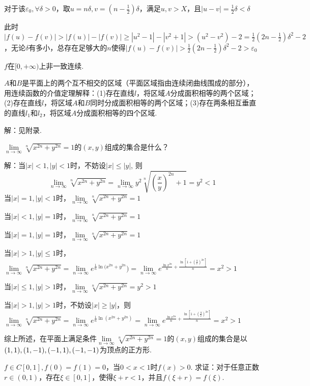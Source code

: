 \documentclass[12pt,UTF8]{ctexart}
\begin{document}
\begin{enumerate}
对于该$\varepsilon_0,\forall\delta>0$，取$u=n\delta,v=(n-\frac12)\delta$，满足$u,v>X$，且$|u-v|=\frac12\delta<\delta$

此时$|f(u)-f(v)|>|f(u)|-|f(v)|\geq|u^2-1|-|v^2+1|>(u^2-v^2)-2=\frac12(2n-\frac12)\delta^2-2$，无论$\delta$有多小，总存在足够大的$n$使得$|f(u)-f(v)|>\frac12(2n-\frac12)\delta^2-2>\varepsilon_0$

$f$在$[0,+\infty)$上非一致连续.

$A$和$B$是平面上的两个互不相交的区域（平面区域指由连续闭曲线围成的部分），用连续函数的介值定理解释：(1)存在直线$l$，将区域$A$分成面积相等的两个区域；(2)存在直线$l$，将区域$A$和$B$同时分成面积相等的两个区域；(3)存在两条相互垂直的直线$l_1$和$l_2$，将区域$A$分成面积相等的四个区域.

解：见附录.

$\lim\limits_{n\rightarrow\infty}\sqrt[n]{x^{2n}+y^{2n}}=1$的$(x,y)$组成的集合是什么？

解：当$|x|<1,|y|<1$时，不妨设$|x|\leq|y|$, 则
\[\lim\limits_{n\rightarrow\infty}\sqrt[n]{x^{2n}+y^{2n}}=\lim\limits_{n\rightarrow\infty}y^2\sqrt[n]{(\frac xy)^{2n}+1}=y^2<1\]
当$|x|=1,|y|<1$时，$\lim\limits_{n\rightarrow\infty}\sqrt[n]{x^{2n}+y^{2n}}=1$

当$|x|<1,|y|=1$时，$\lim\limits_{n\rightarrow\infty}\sqrt[n]{x^{2n}+y^{2n}}=1$

当$|x|=1,|y|=1$时，$\lim\limits_{n\rightarrow\infty}\sqrt[n]{x^{2n}+y^{2n}}=1$

当$|x|>1,|y|\leq1$时，$\lim\limits_{n\rightarrow\infty}\sqrt[n]{x^{2n}+y^{2n}}=\lim\limits_{n\rightarrow\infty}e^{\frac1n\ln(x^{2n}+y^{2n}})=\lim\limits_{n\rightarrow\infty}e^{\frac{\ln x^{2n}}n+\frac{\ln[1+(\frac yx)^{2n}]}{n}}=x^2>1$

当$|x|\leq1,|y|>1$时，$\lim\limits_{n\rightarrow\infty}\sqrt[n]{x^{2n}+y^{2n}}=y^2>1$

当$|x|>1,|y|>1$时，不妨设$|x|\geq|y|$，则$\lim\limits_{n\rightarrow\infty}\sqrt[n]{x^{2n}+y^{2n}}=\lim\limits_{n\rightarrow\infty}e^{\frac1n\ln(x^{2n}+y^{2n})}=\lim\limits_{n\rightarrow\infty}e^{\frac{\ln x^{2n}}n+\frac{\ln[1+(\frac yx)^{2n}]}{n}}=x^2>1$

综上所述，在平面上满足条件$\lim\limits_{n\rightarrow\infty}\sqrt[n]{x^{2n}+y^{2n}}=1$的$(x,y)$组成的集合是以$(1,1),(1,-1),\\(-1,1),(-1,-1)$为顶点的正方形.

$f\in C[0,1],f(0)=f(1)=0$，当$0<x<1$时$f(x)>0$. 求证：对于任意正数$r\in(0,1)$，存在$\xi\in[0,1]$，使得$\xi+r<1$，并且$f(\xi+r)=f(\xi)$.


\end{enumerate}
\end{document}
